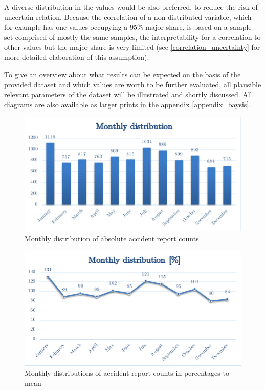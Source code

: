 \documentclass[a4paper,12pt]{report}
\begin{document}
A diverse distribution in the values would be also preferred, to reduce the risk of uncertain relation. Because the correlation of a non distributed variable, which for example has one values occupying a 95\% major share, is based on a sample set comprised of mostly the same samples, the interpretability for a correlation to other values but the major share is very limited (see \ref{correlation_uncertainty} for more detailed elaboration of this assumption).
\newline
\par To give an overview about what results can be expected on the basis of the provided dataset and which values are worth to be further evaluated, all plausible relevant parameters of the dataset will be illustrated and shortly discussed. All diagrams are also available as larger prints in the appendix \ref{appendix_baysis}. 

\begin{figure}[h]
	\centering
	\includegraphics[scale=0.8]{./assets/baysis_dataset_monthly_absolute.pdf}
	\caption{Monthly distribution of absolute accident report counts}
	\label{img:baysis_monthlyDist_absolute}
\end{figure}

\begin{figure}[h]
	\centering
	\includegraphics[scale=0.8]{./assets/baysis_dataset_monthly_percentage.pdf}
	\caption{Monthly distributions of accident report counts in percentages to mean}
	\label{img:baysis_monthlyDist_percentage}
\end{figure}
\end{document}
